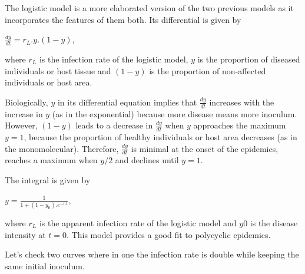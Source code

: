 \documentclass[
  letterpaper,
]{book}
\begin{document}
The logistic model is a more elaborated version of the two previous
models as it incorporates the features of them both. Its differential is
given by

\(\frac{dy}{dt} = r_L. y . (1 - y)\),

where \(r_L\) is the infection rate of the logistic model, \(y\) is the
proportion of diseased individuals or host tissue and \((1-y)\) is the
proportion of non-affected individuals or host area.

Biologically, \(y\) in its differential equation implies that
\(\frac{dy}{dt}\) increases with the increase in \(y\) (as in the
exponential) because more disease means more inoculum. However,
\((1-y)\) leads to a decrease in \(\frac{dy}{dt}\) when \(y\) approaches
the maximum \(y=1\), because the proportion of healthy individuals or
host area decreases (as in the monomolecular). Therefore,
\(\frac{dy}{dt}\) is minimal at the onset of the epidemics, reaches a
maximum when \(y/2\) and declines until \(y=1\).

The integral is given by

\(y = \frac{1}{1 + (1-y_0).e^{-r.t}}\),

where \(r_L\) is the apparent infection rate of the logistic model and
\(y0\) is the disease intensity at \(t=0\). This model provides a good
fit to polycyclic epidemics.

Let's check two curves where in one the infection rate is double while
keeping the same initial inoculum.
\end{document}

